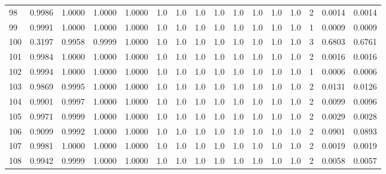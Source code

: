 \begin{tabular}{lrrrrrrrrrrrrrrr}
98  &      0.9986 &  1.0000 &  1.0000 &  1.0000 &     1.0 &     1.0 &     1.0 &     1.0 &     1.0 &     1.0 &      1.0 &        1.0 &      2 &                    0.0014 &                     0.0014 \\
99  &      0.9991 &  1.0000 &  1.0000 &  1.0000 &     1.0 &     1.0 &     1.0 &     1.0 &     1.0 &     1.0 &      1.0 &        1.0 &      1 &                    0.0009 &                     0.0009 \\
100 &      0.3197 &  0.9958 &  0.9999 &  1.0000 &     1.0 &     1.0 &     1.0 &     1.0 &     1.0 &     1.0 &      1.0 &        1.0 &      3 &                    0.6803 &                     0.6761 \\
101 &      0.9984 &  1.0000 &  1.0000 &  1.0000 &     1.0 &     1.0 &     1.0 &     1.0 &     1.0 &     1.0 &      1.0 &        1.0 &      2 &                    0.0016 &                     0.0016 \\
102 &      0.9994 &  1.0000 &  1.0000 &  1.0000 &     1.0 &     1.0 &     1.0 &     1.0 &     1.0 &     1.0 &      1.0 &        1.0 &      1 &                    0.0006 &                     0.0006 \\
103 &      0.9869 &  0.9995 &  1.0000 &  1.0000 &     1.0 &     1.0 &     1.0 &     1.0 &     1.0 &     1.0 &      1.0 &        1.0 &      2 &                    0.0131 &                     0.0126 \\
104 &      0.9901 &  0.9997 &  1.0000 &  1.0000 &     1.0 &     1.0 &     1.0 &     1.0 &     1.0 &     1.0 &      1.0 &        1.0 &      2 &                    0.0099 &                     0.0096 \\
105 &      0.9971 &  0.9999 &  1.0000 &  1.0000 &     1.0 &     1.0 &     1.0 &     1.0 &     1.0 &     1.0 &      1.0 &        1.0 &      2 &                    0.0029 &                     0.0028 \\
106 &      0.9099 &  0.9992 &  1.0000 &  1.0000 &     1.0 &     1.0 &     1.0 &     1.0 &     1.0 &     1.0 &      1.0 &        1.0 &      2 &                    0.0901 &                     0.0893 \\
107 &      0.9981 &  1.0000 &  1.0000 &  1.0000 &     1.0 &     1.0 &     1.0 &     1.0 &     1.0 &     1.0 &      1.0 &        1.0 &      2 &                    0.0019 &                     0.0019 \\
108 &      0.9942 &  0.9999 &  1.0000 &  1.0000 &     1.0 &     1.0 &     1.0 &     1.0 &     1.0 &     1.0 &      1.0 &        1.0 &      2 &                    0.0058 &                     0.0057 \\

\end{tabular}
